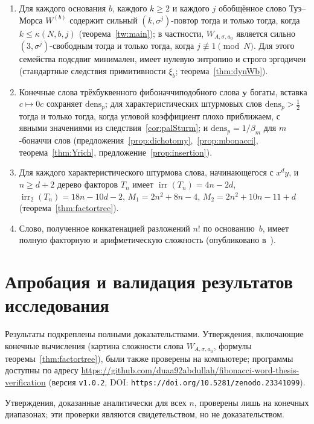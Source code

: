 \documentclass[a4paper,14pt]{extreport}
\theoremstyle{plain}
\theoremstyle{definition}
\theoremstyle{remark}
\begin{document}
	\begin{enumerate}
		\item Для каждого основания $b$, каждого $k\ge2$ и каждого $j$ обобщённое слово Туэ--Морса $W^{(b)}$ содержит сильный $(k,\sigma^j)$-повтор тогда и только тогда, когда
		$k\le\kappa(N,b,j)$ (теорема~\ref{tw:main}); в частности, $W_{A,\sigma,a_0}$ является сильно $(3,\sigma^j)$-свободным тогда и только тогда, когда $j\not\equiv1\pmod N$.
		Для этого семейства подсдвиг минимален, имеет нулевую энтропию и строго эргодичен (стандартные следствия примитивности $\xi_b$; теорема~\ref{thm:dynWb}).
		\item Конечные слова трёхбуквенного фибоначчиподобного слова $\mathbf y$ богаты, вставка $c\mapsto0c$ сохраняет $\mathrm{dens}_p$; для характеристических штурмовых слов $\mathrm{dens}_p>\tfrac12$ тогда и только тогда, когда угловой коэффициент плохо приближаем, с явными значениями из следствия~\ref{cor:palSturm}; и $\mathrm{dens}_p=1/\beta_m$ для $m$-боначчи слов (предложения~\ref{prop:dichotomy},~\ref{prop:mbonacci}, теорема~\ref{thm:Yrich}, предложение~\ref{prop:insertion}).
		
		\item Для каждого характеристического штурмова слова, начинающегося с $x^dy$, и $n\ge d+2$ дерево факторов $T_n$ имеет $\operatorname{irr}(T_n)=4n-2d$,
		$\operatorname{irr}_2(T_n)=18n-10d-2$, $M_1=2n^2+8n-4$, $M_2=2n^2+10n-11+d$ (теорема~\ref{thm:factortree}).
		\item Слово, полученное конкатенацией разложений $n!$ по основанию~$b$, имеет полную факторную и арифметическую сложность (опубликовано в~\cite{Duaa23}).
	\end{enumerate}
	\section*{Апробация и валидация результатов исследования}
	
	Результаты подкреплены полными доказательствами. Утверждения, включающие конечные вычисления (картина сложности слова $W_{A,\sigma,a_0}$, формулы теоремы~\ref{thm:factortree}),
	были также проверены на компьютере; программы доступны по адресу \url{https://github.com/duaa92abdullah/fibonacci-word-thesis-verification} (версия \texttt{v1.0.2}, DOI: \texttt{https://doi.org/10.5281/zenodo.23341099}).
	
	Утверждения, доказанные аналитически для всех $n$, проверены лишь на конечных диапазонах; эти проверки являются свидетельством, но не доказательством.
	
\end{document}
